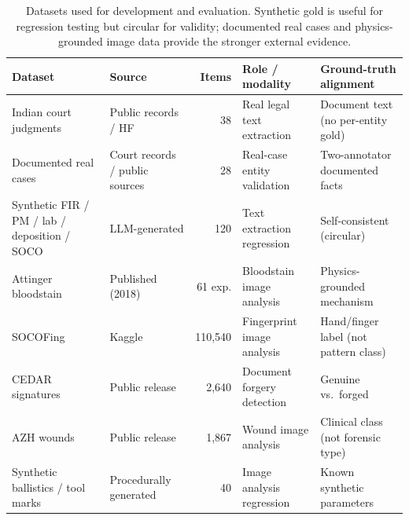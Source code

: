 \begin{table}[t]
  \centering
  \caption{Datasets used for development and evaluation. Synthetic gold is useful
  for regression testing but circular for validity; documented real cases and
  physics-grounded image data provide the stronger external evidence.}
  \label{tab:datasets}
  \small
  \begin{tabular}{@{}P{3.2cm} P{2.7cm} r P{4.3cm} P{3.6cm}@{}}
    \toprule
    \textbf{Dataset} & \textbf{Source} & \textbf{Items} & \textbf{Role / modality} & \textbf{Ground-truth alignment} \\
    \midrule
    Indian court judgments & Public records / HF~\cite{indiancourt} & 38 & Real legal text extraction & Document text (no per-entity gold) \\
    Documented real cases  & Court records / public sources & 28 & Real-case entity validation & Two-annotator documented facts \\
    Synthetic FIR / PM / lab / deposition / SOCO & LLM-generated & 120 & Text extraction regression & Self-consistent (circular) \\
    Attinger bloodstain~\cite{attinger2018bloodstain} & Published (2018) & 61 exp. & Bloodstain image analysis & Physics-grounded mechanism \\
    SOCOFing~\cite{socofing} & Kaggle & 110{,}540 & Fingerprint image analysis & Hand/finger label (not pattern class) \\
    CEDAR signatures~\cite{cedar2004signature} & Public release & 2{,}640 & Document forgery detection & Genuine vs.\ forged \\
    AZH wounds~\cite{azhwound} & Public release & 1{,}867 & Wound image analysis & Clinical class (not forensic type) \\
    Synthetic ballistics / tool marks & Procedurally generated & 40 & Image analysis regression & Known synthetic parameters \\
    \bottomrule
  \end{tabular}
\end{table}
